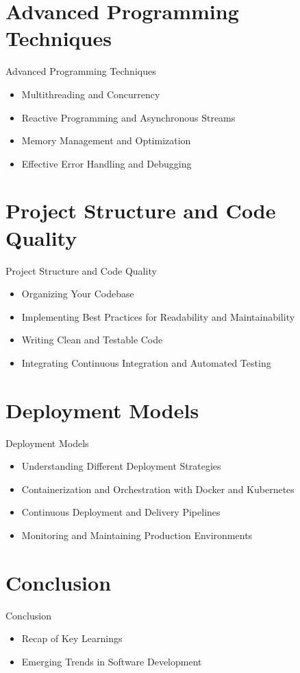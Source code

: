 \documentclass{beamer}
\begin{document}
\section{Advanced Programming Techniques}
\begin{frame}{Advanced Programming Techniques}
	\scriptsize
	\begin{itemize}
		\item<1-> Multithreading and Concurrency
		\item<2-> Reactive Programming and Asynchronous Streams
		\item<3-> Memory Management and Optimization
		\item<4-> Effective Error Handling and Debugging
	\end{itemize}
	\begin{center}
	\end{center}
\end{frame}

\section{Project Structure and Code Quality}
\begin{frame}{Project Structure and Code Quality}
	\begin{itemize}
		\item Organizing Your Codebase
		\item Implementing Best Practices for Readability and Maintainability
		\item Writing Clean and Testable Code
		\item Integrating Continuous Integration and Automated Testing
	\end{itemize}
\end{frame}

\section{Deployment Models}
\begin{frame}{Deployment Models}
	\begin{itemize}
		\item Understanding Different Deployment Strategies
		\item Containerization and Orchestration with Docker and Kubernetes
		\item Continuous Deployment and Delivery Pipelines
		\item Monitoring and Maintaining Production Environments
	\end{itemize}
\end{frame}

\section{Conclusion}
\begin{frame}{Conclusion}
	\begin{itemize}
		\item Recap of Key Learnings
		\item Emerging Trends in Software Development
	\end{itemize}
\end{frame}
\end{document}
